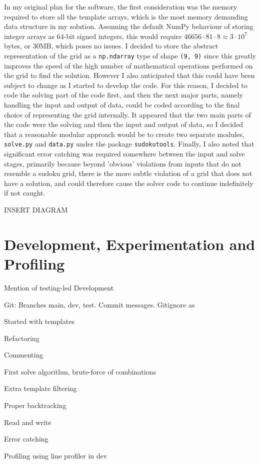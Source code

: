 \documentclass[12pt]{article}
\begin{document}
In my original plan for the software, the first consideration was the memory required to store all the template arrays, which is the most memory demanding data structure in my solution.
Assuming the default NumPy behaviour of storing integer arrays as 64-bit signed integers, this would require $46656\cdot81\cdot8\approx3\cdot10^7$ bytes, or 30MB, which poses no issues.
I decided to store the abstract representation of the grid as a \texttt{np.ndarray} type of shape \texttt{(9, 9)} since this greatly improves the speed of the high number of mathematical operations performed on the grid to find the solution.
However I also anticipated that this could have been subject to change as I started to develop the code.
For this reason, I decided to code the solving part of the code first, and then the next major parts, namely handling the input and output of data, could be coded according to the final choice of representing the grid internally.
It appeared that the two main parts of the code were the solving and then the input and output of data, so I decided that a reasonable modular approach would be to create two separate modules, \texttt{solve.py} and \texttt{data.py} under the package \texttt{sudokutools}.
Finally, I also noted that significant error catching was required somewhere between the input and solve stages, primarily because beyond 'obvious' violations from inputs that do not resemble a sudoku grid, there is the more subtle violation of a grid that does not have a solution, and could therefore cause the solver code to continue indefinitely if not caught.


INSERT DIAGRAM
\section*{Development, Experimentation and Profiling}
Mention of testing-led Development

Git: Branches main, dev, test. Commit messages. Gitignore as

Started with templates

Refactoring

Commenting

First solve algorithm, brute-force of combinations

Extra template filtering

Proper backtracking

Read and write

Error catching

Profiling using line profiler in dev
\end{document}
